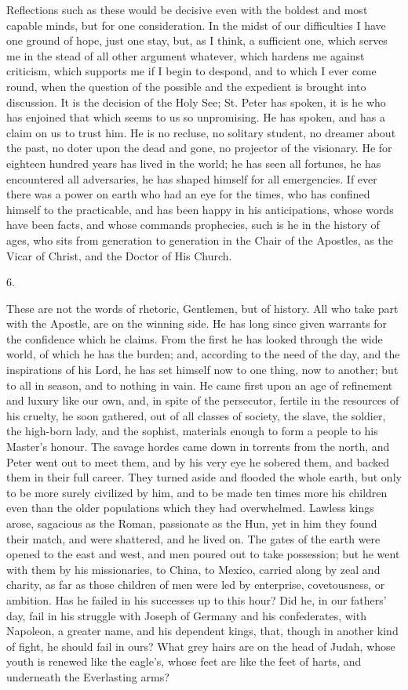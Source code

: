 Reflections such as these would be decisive even with the boldest
and most capable minds, but for one consideration. In the midst of our
difficulties I have one ground of hope, just one stay, but, as I
think, a sufficient one, which serves me in the stead of all other
argument whatever, which hardens me against criticism, which supports
me if I begin to despond, and to which I ever come round, when the
question of the possible and the expedient is brought into discussion.
It is the decision of the Holy See; St. Peter has spoken, it is he who
has enjoined that which seems to us so unpromising. He has spoken, and
has a claim on us to trust him. He is no recluse, no solitary student,
no dreamer about the past, no doter upon the dead and gone, no
projector of the visionary. He for eighteen hundred years has lived in
the world; he has seen all fortunes, he has encountered all
adversaries, he has shaped himself for all emergencies. If ever there
was a power on earth who had an eye for the times, who has confined
himself to the practicable, and has been happy in his anticipations,
whose words have been facts, and whose commands prophecies, such is he
in the history of ages, who sits from generation to generation in the
Chair of the Apostles, as the Vicar of Christ, and the Doctor of His
Church.

6.

These are not the words of rhetoric, Gentlemen, but of history. All
who take part with the Apostle, are on the winning side. He has long
since given warrants for the confidence which he claims. From the
first he has looked through the wide world, of which he has the
burden; and, according to the need of the day, and the inspirations of
his Lord, he has set himself now to one thing, now to another; but to
all in season, and to nothing in vain. He came first upon an age of
refinement and luxury like our own, and, in spite of the persecutor,
fertile in the resources of his cruelty, he soon gathered, out of all
classes of society, the slave, the soldier, the high-born lady, and
the sophist, materials enough to form a people to his Master's honour.
The savage hordes came down in torrents from the north, and Peter went
out to meet them, and by his very eye he sobered them, and backed them
in their full career. They turned aside and flooded the whole earth,
but only to be more surely civilized by him, and to be made ten times
more his children even than the older populations which they had
overwhelmed. Lawless kings arose, sagacious as the Roman, passionate
as the Hun, yet in him they found their match, and were shattered, and
he lived on. The gates of the earth were opened to the east and west,
and men poured out to take possession; but he went with them by his
missionaries, to China, to Mexico, carried along by zeal and charity,
as far as those children of men were led by enterprise, covetousness,
or ambition. Has he failed in his successes up to this hour? Did he,
in our fathers' day, fail in his struggle with Joseph of Germany and
his confederates, with Napoleon, a greater name, and his dependent
kings, that, though in another kind of fight, he should fail in ours?
What grey hairs are on the head of Judah, whose youth is renewed like
the eagle's, whose feet are like the feet of harts, and underneath the
Everlasting arms?

